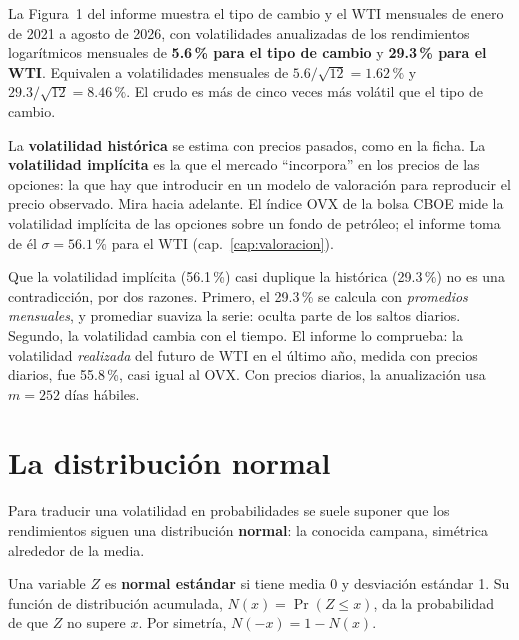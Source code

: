 \begin{informe}
La Figura~1 del informe muestra el tipo de cambio y el WTI mensuales de enero de 2021 a agosto de 2026, con volatilidades anualizadas de los rendimientos logarítmicos mensuales de \textbf{5.6\,\% para el tipo de cambio} y \textbf{29.3\,\% para el WTI}. Equivalen a volatilidades mensuales de $5.6/\sqrt{12}=1.62\,\%$ y $29.3/\sqrt{12}=8.46\,\%$. El crudo es más de cinco veces más volátil que el tipo de cambio.
\end{informe}


\begin{definicion}
La \textbf{volatilidad histórica} se estima con precios pasados, como en la ficha. La \textbf{volatilidad implícita} es la que el mercado \enquote{incorpora} en los precios de las opciones: la que hay que introducir en un modelo de valoración para reproducir el precio observado. Mira hacia adelante. El índice OVX de la bolsa CBOE mide la volatilidad implícita de las opciones sobre un fondo de petróleo; el informe toma de él $\sigma=56.1\,\%$ para el WTI (cap.~\ref{cap:valoracion}).
\end{definicion}

Que la volatilidad implícita (56.1\,\%) casi duplique la histórica (29.3\,\%) no es una contradicción, por dos razones. Primero, el 29.3\,\% se calcula con \emph{promedios mensuales}, y promediar suaviza la serie: oculta parte de los saltos diarios. Segundo, la volatilidad cambia con el tiempo. El informe lo comprueba: la volatilidad \emph{realizada} del futuro de WTI en el último año, medida con precios diarios, fue 55.8\,\%, casi igual al OVX. Con precios diarios, la anualización usa $m=252$ días hábiles.

\section{La distribución normal}

Para traducir una volatilidad en probabilidades se suele suponer que los rendimientos siguen una distribución \textbf{normal}: la conocida campana, simétrica alrededor de la media.

\begin{definicion}
Una variable $Z$ es \textbf{normal estándar} si tiene media 0 y desviación estándar 1. Su función de distribución acumulada, $N(x)=\Pr(Z\le x)$, da la probabilidad de que $Z$ no supere $x$. Por simetría, $N(-x)=1-N(x)$.
\end{definicion}

